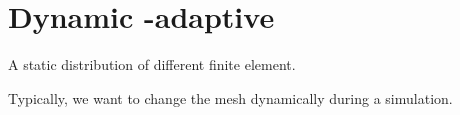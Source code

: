 \chapter{Dynamic \hp-adaptive }
\label{ch:dynamic}

A static distribution of different finite element.

Typically, we want to change the mesh dynamically during a simulation.




